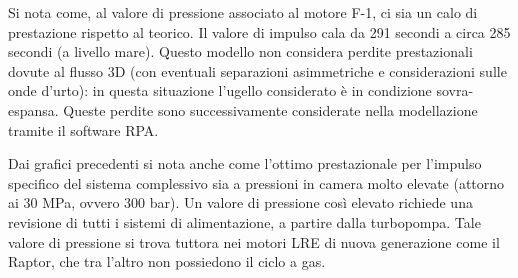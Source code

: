 Si nota come, al valore di pressione associato al motore F-1, ci sia un calo di prestazione rispetto al teorico. Il valore di impulso cala da 291 secondi a circa 285 secondi (a livello mare). Questo modello non considera perdite prestazionali dovute al flusso 3D (con eventuali separazioni asimmetriche e considerazioni sulle onde d'urto): in questa situazione l'ugello considerato è in condizione sovra-espansa. Queste perdite sono successivamente considerate nella modellazione tramite il software RPA.

Dai grafici precedenti si nota anche come l'ottimo prestazionale per l'impulso specifico del sistema complessivo sia a pressioni in camera molto elevate (attorno ai 30 MPa, ovvero 300 bar). Un valore di pressione così elevato richiede una revisione di tutti i sistemi di alimentazione, a partire dalla turbopompa. Tale valore di pressione si trova tuttora nei motori LRE di nuova generazione come il Raptor, che tra l'altro non possiedono il ciclo a gas.